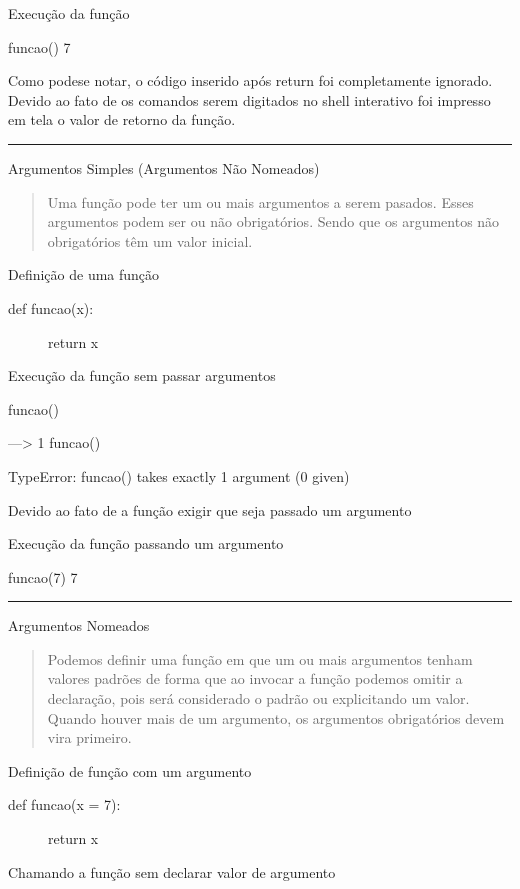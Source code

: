 \documentclass[letterpaper,10pt,brazil]{sphinxmanual}
\begin{document}
Execução da função

funcao()
7

Como pode\sphinxhyphen{}se notar, o código inserido após return foi completamente ignorado.
Devido ao fato de os comandos serem digitados no shell interativo foi impresso em tela
o valor de retorno da função.


\bigskip\hrule\bigskip


Argumentos Simples (Argumentos Não Nomeados)
\begin{quote}

Uma função pode ter um ou mais argumentos a serem pasados.
Esses argumentos podem ser ou não obrigatórios. Sendo que os argumentos não obrigatórios têm um valor inicial.
\end{quote}

Definição de uma função
\begin{description}
\item[{def funcao(x):}] \leavevmode
return x

\end{description}

Execução da função sem passar argumentos

funcao()

—\sphinxhyphen{}\textgreater{} 1 funcao()

TypeError: funcao() takes exactly 1 argument (0 given)

Devido ao fato de a função exigir que seja passado um argumento

Execução da função passando um argumento

funcao(7)
7


\bigskip\hrule\bigskip


Argumentos Nomeados
\begin{quote}

Podemos definir uma função em que um ou mais argumentos tenham valores padrões de forma que ao invocar a função podemos omitir a declaração, pois será considerado o padrão ou explicitando um valor.
Quando houver mais de um argumento, os argumentos obrigatórios devem vira primeiro.
\end{quote}

Definição de função com um argumento
\begin{description}
\item[{def funcao(x = 7):}] \leavevmode
return x

\end{description}

Chamando a função sem declarar valor de argumento
\end{document}

